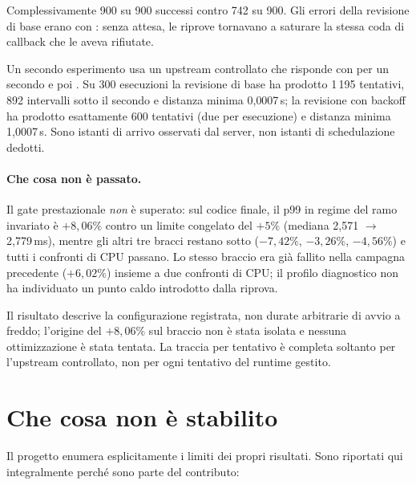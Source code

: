 Complessivamente 900 su 900 successi contro 742 su 900. Gli errori della
revisione di base erano  con
: senza attesa, le riprove tornavano a
saturare la stessa coda di callback che le aveva rifiutate.

Un secondo esperimento usa un upstream  controllato che risponde
 con  per un secondo e poi . Su 300
esecuzioni la revisione di base ha prodotto 1\,195 tentativi, 892 intervalli
sotto il secondo e distanza minima 0{,}0007\,s; la revisione con backoff ha
prodotto esattamente 600 tentativi (due per esecuzione) e distanza minima
1{,}0007\,s. Sono istanti di arrivo osservati dal server, non istanti di
schedulazione dedotti.

\paragraph{Che cosa non \`e passato.} Il gate prestazionale \emph{non} \`e superato:
sul codice finale, il p99 in regime del ramo  invariato \`e
$+8{,}06\%$ contro un limite congelato del $+5\%$ (mediana 2{,}571 $\to$
2{,}779\,ms), mentre gli altri tre bracci restano sotto ($-7{,}42\%$,
$-3{,}26\%$, $-4{,}56\%$) e tutti i confronti di CPU passano. Lo stesso braccio
era gi\`a fallito nella campagna precedente ($+6{,}02\%$) insieme a due
confronti di CPU; il profilo diagnostico non ha individuato un punto caldo
introdotto dalla riprova.

\begin{damisurare}
Il risultato descrive la configurazione registrata, non durate arbitrarie di
avvio a freddo; l'origine del $+8{,}06\%$ sul braccio  non \`e
stata isolata e nessuna ottimizzazione \`e stata tentata. La traccia per
tentativo \`e completa soltanto per l'upstream controllato, non per ogni
tentativo del runtime gestito.
\end{damisurare}

\section{Che cosa non \`e stabilito}

Il progetto enumera esplicitamente i limiti dei propri risultati. Sono riportati
qui integralmente perch\'e sono parte del contributo:

